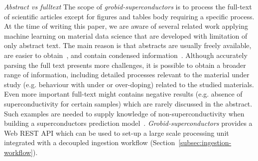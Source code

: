 \documentclass{article}
\begin{document}
\emph{Abstract vs fulltext}
The scope of \textit{grobid-superconductors} is to process the full-text of scientific articles except for figures and tables body requiring a specific process. 
At the time of writing this paper, we are aware of several related work applying machine learning on material data science that are developed with limitation of  only abstract text.
The main reason is that abstracts are usually freely available, are easier to obtain~\cite{kononova_text-mined_2019}, and contain condensed information~\cite{yamaguchi-etal-2020-sc, court_magnetic_2020}. 
Although accurately parsing the full text presents more challenges, it is possible to obtain a broader range of information, including detailed processes relevant to the material under study (e.g. behaviour with under or over-doping) related to the studied materials. Even more important full-text might contains negative results (e.g. absence of superconductivity for certain samples) which are rarely discussed in the abstract. 
Such examples are needed to supply knowledge of non-superconductivity when building a superconductors prediction model~\cite{stanev_machine_2017}. 
\textit{Grobid-superconductors} provides a Web REST API which can be used to set-up a large scale processing unit integrated with a decoupled ingestion workflow (Section~\ref{subsec:ingestion-workflow}).
\end{document}
